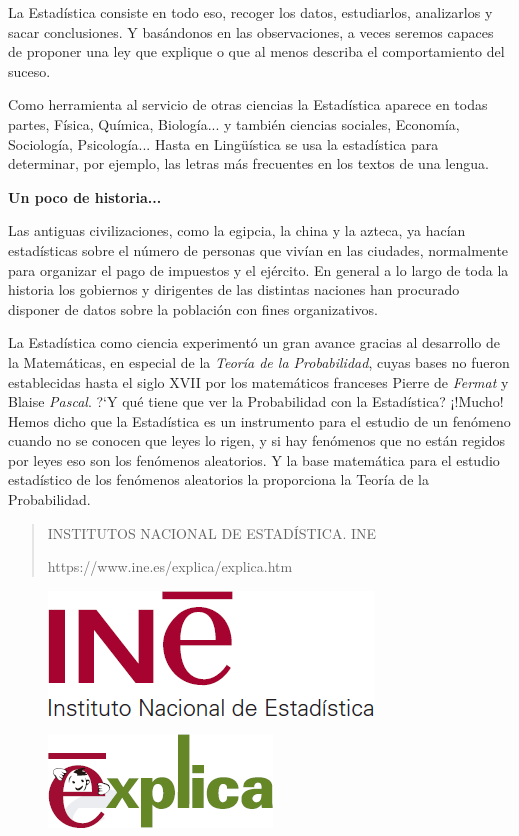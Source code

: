 La Estadística consiste en todo eso, recoger los datos, estudiarlos, analizarlos y sacar conclusiones. Y basándonos en las observaciones, a veces seremos capaces de proponer una ley que explique o que al menos describa el comportamiento del suceso. 

Como herramienta al servicio de otras ciencias la Estadística aparece en todas partes, Física, Química, Biología... y también ciencias sociales, Economía, Sociología, Psicología...  Hasta en Lingüística se usa la estadística para determinar, por ejemplo, las letras más frecuentes en los textos de una lengua.  

\textbf{Un poco de historia...} 

Las antiguas civilizaciones, como la egipcia, la china y la azteca, ya hacían estadísticas sobre el número de personas que vivían en las ciudades, normalmente para organizar el pago de impuestos y el ejército. En general a lo largo de toda la historia los gobiernos y dirigentes de las distintas naciones han procurado disponer de datos sobre la población con fines organizativos. 

La Estadística como ciencia experimentó un gran avance gracias al desarrollo de la Matemáticas, en especial de la \emph{Teoría de la Probabilidad}, cuyas bases no fueron establecidas hasta el siglo XVII por los matemáticos franceses Pierre de \emph{Fermat} y Blaise \emph{Pascal}. ?`Y qué tiene que ver la Probabilidad con la Estadística? ¡!Mucho! Hemos dicho que la Estadística es un instrumento para el estudio de un fenómeno cuando no se conocen que leyes lo rigen, y si hay fenómenos que no están regidos por leyes eso son los fenómenos aleatorios. Y la base matemática para el estudio estadístico de los fenómenos aleatorios la proporciona la Teoría de la Probabilidad. 

\begin{footnotesize}
\begin{quotation}
	\textcolor{gris}{INSTITUTOS NACIONAL DE ESTADÍSTICA. \textsf{INE}}
	
	\textcolor{gris}{https://www.ine.es/explica/explica.htm}
	
\end{quotation}
\end{footnotesize}

\begin{multicols}{2}
\begin{figure}[H]
	\centering
	\includegraphics[width=.3\textwidth]{imagenes/imagenes00/T01IM03.png}
\end{figure}
\begin{figure}[H]
	\centering
	\includegraphics[width=.3\textwidth]{imagenes/imagenes00/T01IM02.png}
\end{figure}
\end{multicols}

